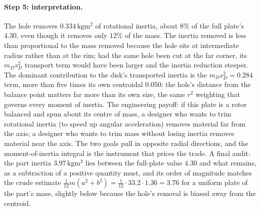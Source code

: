 \paragraph{Step 5: interpretation.} The hole removes
$0.334\,\si{\kilogram\meter\squared}$ of rotational inertia, about
$8\%$ of the full plate's $4.30$, even though it removes only $12\%$
of the mass. The inertia removed is less than proportional to the
mass removed because the hole sits at intermediate radius rather than
at the rim; had the same hole been cut at the far corner, its $m_{D}
s_{D}^{2}$ transport term would have been larger and the inertia
reduction steeper. The dominant contribution to the disk's
transported inertia is the $m_{D} s_{D}^{2} = 0.284$ term, more than
five times its own centroidal $0.050$: the hole's distance from the
balance point matters far more than its own size, the same $r^{2}$
weighting that governs every moment of inertia. The engineering
payoff: if this plate is a rotor balanced and spun about its centre
of mass, a designer who wants to trim rotational inertia (to speed
up angular acceleration) removes material far from the axis; a
designer who wants to trim mass without losing inertia removes
material near the axis. The two goals pull in opposite radial
directions, and the moment-of-inertia integral is the instrument that
prices the trade. A final audit: the part inertia $3.97\,\si{
\kilogram\meter\squared}$ lies between the full-plate value $4.30$
and what remains, as a subtraction of a positive quantity must, and
its order of magnitude matches the crude estimate $\tfrac{1}{12} m
(a^{2} + b^{2}) = \tfrac{1}{12}\cdot 33.2\cdot 1.36 = 3.76$ for a
uniform plate of the part's mass, slightly below because the hole's
removal is biased away from the centroid.

